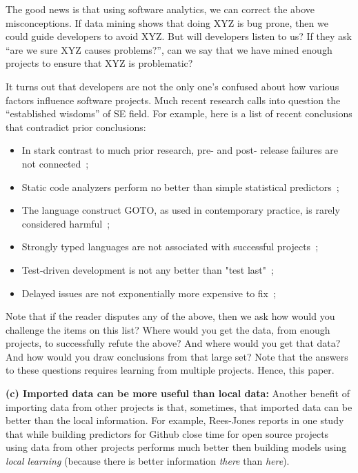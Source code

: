 \documentclass[10pt,journal,compsoc]{IEEEtran}
\newcommand{\bi}{\begin{itemize}}
\newcommand{\ei}{\end{itemize}}
\begin{document}
The good news is that using software analytics, we can correct the above misconceptions. If data mining shows that doing  XYZ is bug prone, then we could  guide developers to avoid XYZ. But will developers listen to us? If they ask ``are we sure  XYZ causes problems?'', can we say that we have mined enough projects to ensure that XYZ is problematic? 

It turns out that developers are not the only one's confused about how various factors influence software projects. Much recent research calls into question  the ``established wisdoms'' of SE field. For example, here is a list of recent conclusions that contradict prior conclusions:

\bi

    \item In stark contrast to  much prior research, pre- and post- release failures are not connected~\cite{fenton2000quantitative};
    
    \item Static code analyzers perform no better than simple statistical predictors~\cite{Fa13}; 
    
    \item The language construct GOTO, as used in contemporary practice, is rarely considered harmful~\cite{nagappan2015empirical};
    
    \item Strongly typed languages are not associated with successful projects~\cite{ray2014large};  
    
    \item Test-driven development is not any better than "test last"~\cite{fucci2017dissection};
    
    \item Delayed issues are not exponentially more expensive to fix~\cite{menzies2017delayed};

\ei
Note that if the reader disputes any of the above, then we ask how would you challenge the items on this list? Where would you get the data, from enough projects, to   successfully refute the above? And where would you get that data? And how would you draw conclusions from that large set? Note that the answers to these questions requires learning from multiple projects. Hence, this paper.

\textbf{(c) Imported data can be more useful than local data:} Another benefit of  importing data from other projects is that, sometimes, that imported data can be better than the local information. For example, Rees-Jones reports in one study that while building predictors
for Github close time  for open source projects~\cite{rees2017better} using data from other projects performs much better then building models using {\em local learning} (because there is better  information {\em there} than {\em here}).
\end{document}
